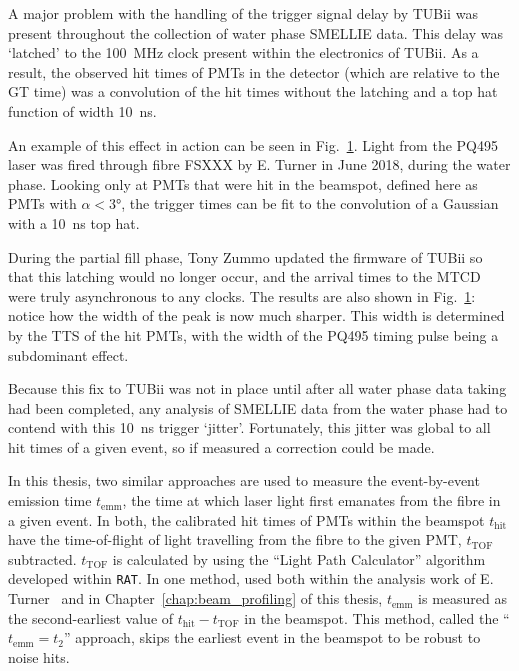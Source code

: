 A major problem with the handling of the trigger signal delay by TUBii was present throughout the collection of water phase SMELLIE data. This delay was `latched' to the \SI{100}{\MHz} clock present within the electronics of TUBii. As a result, the observed hit times of PMTs in the detector (which are relative to the GT time) was a convolution of the hit times without the latching and a top hat function of width \SI{10}{\ns}.

An example of this effect in action can be seen in Fig.~\ref{fig:smellie_beam_tres_tubii_comparison}. Light from the PQ495 laser was fired through fibre FSXXX %
by E. Turner in June 2018, during the water phase. Looking only at PMTs that were hit in the beamspot, defined here as PMTs with $\alpha<\ang{3}$, the trigger times can be fit to the convolution of a Gaussian with a \SI{10}{\ns} top hat.

\begin{figure}
    \centering
    \caption[]{}
    \label{fig:smellie_beam_tres_tubii_comparison}
\end{figure}

During the partial fill phase, Tony Zummo updated the firmware of TUBii so that this latching would no longer occur, and the arrival times to the MTCD were truly asynchronous to any clocks. The results are also shown in Fig.~\ref{fig:smellie_beam_tres_tubii_comparison}: notice how the width of the peak is now much sharper. This width is determined by the TTS of the hit PMTs, with the width of the PQ495 timing pulse being a subdominant effect.

Because this fix to TUBii was not in place until after all water phase data taking had been completed, any analysis of SMELLIE data from the water phase had to contend with this \SI{10}{\ns} trigger `jitter'. Fortunately, this jitter was global to all hit times of a given event, so if measured a correction could be made.

In this thesis, two similar approaches are used to measure the event-by-event emission time $t_{\mathrm{emm}}$, the time at which laser light first emanates from the fibre in a given event. In both, the calibrated hit times of PMTs within the beamspot $t_{\mathrm{hit}}$ have the time-of-flight of light travelling from the fibre to the given PMT, $t_{\mathrm{TOF}}$ subtracted. $t_{\mathrm{TOF}}$ is calculated by using the ``Light Path Calculator'' algorithm developed within \texttt{RAT}. In one method, used both within the analysis work of E. Turner~\cite{turnerMeasurementScatteringCharacteristics2022} %
and in Chapter~\ref{chap:beam_profiling} of this thesis, $t_{\mathrm{emm}}$ is measured as the second-earliest value of $t_{\mathrm{hit}}-t_{\mathrm{TOF}}$ in the beamspot. This method, called the ``$t_{\mathrm{emm}} = t_{2}$'' approach, skips the earliest event in the beamspot to be robust to noise hits.

